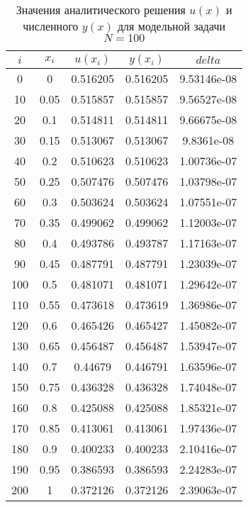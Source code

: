 \documentclass[a4paper,12pt,titlepage]{article}
\begin{document}
\begin{table}[h]
\centering
\begin{tabular}{|c|c|c|c|c|}
\hline
$i$ & $x_i$ & $u(x_i)$ & $y(x_i)$ & $delta$ \\
\hline
0&0&0.516205&0.516205&9.53146e-08\\
10&0.05&0.515857&0.515857&9.56527e-08\\
20&0.1&0.514811&0.514811&9.66675e-08\\
30&0.15&0.513067&0.513067&9.8361e-08\\
40&0.2&0.510623&0.510623&1.00736e-07\\
50&0.25&0.507476&0.507476&1.03798e-07\\
60&0.3&0.503624&0.503624&1.07551e-07\\
70&0.35&0.499062&0.499062&1.12003e-07\\
80&0.4&0.493786&0.493787&1.17163e-07\\
90&0.45&0.487791&0.487791&1.23039e-07\\
100&0.5&0.481071&0.481071&1.29642e-07\\
110&0.55&0.473618&0.473619&1.36986e-07\\
120&0.6&0.465426&0.465427&1.45082e-07\\
130&0.65&0.456487&0.456487&1.53947e-07\\
140&0.7&0.44679&0.446791&1.63596e-07\\
150&0.75&0.436328&0.436328&1.74048e-07\\
160&0.8&0.425088&0.425088&1.85321e-07\\
170&0.85&0.413061&0.413061&1.97436e-07\\
180&0.9&0.400233&0.400233&2.10416e-07\\
190&0.95&0.386593&0.386593&2.24283e-07\\
200&1&0.372126&0.372126&2.39063e-07\\
\hline
\end{tabular}
\caption{Значения аналитического решения $u(x)$ и численного $y(x)$ для модельной задачи $N=100$}
\label{table}
\end{table}

\newpage
\end{document}
